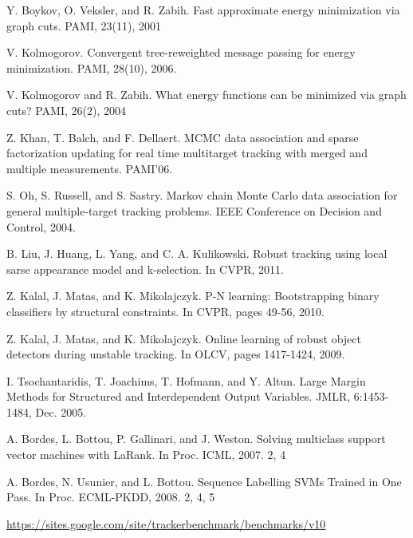 \documentclass{acm_proc_article-sp}
\begin{document}
\begin{thebibliography}{99}
Y. Boykov, O. Veksler, and R. Zabih. Fast approximate energy minimization via graph cuts. PAMI, 23(11), 2001

V. Kolmogorov. Convergent tree-reweighted message passing for energy minimization. PAMI, 28(10), 2006.

V. Kolmogorov and R. Zabih. What energy functions can be minimized via graph cuts? PAMI, 26(2), 2004

Z. Khan, T. Balch, and F. Dellaert. MCMC data association and sparse factorization updating for real time multitarget tracking with merged and multiple measurements. PAMI'06.

S. Oh, S. Russell, and S. Sastry. Markov chain Monte Carlo data association for general multiple-target tracking problems. IEEE Conference on Decision and Control, 2004.

B. Liu, J. Huang, L. Yang, and C. A. Kulikowski. Robust tracking using local sarse appearance model and k-selection. In CVPR, 2011.

Z. Kalal, J. Matas, and K. Mikolajczyk. P-N learning: Bootstrapping binary classifiers by structural constraints. In CVPR, pages 49-56, 2010.

Z. Kalal, J. Matas, and K. Mikolajczyk. Online learning of robust object detectors during unstable tracking. In OLCV, pages 1417-1424, 2009.

I. Tsochantaridis, T. Joachims, T. Hofmann, and Y. Altun. Large Margin Methods for Structured and Interdependent Output Variables. JMLR, 6:1453-1484, Dec. 2005.

A. Bordes, L. Bottou, P. Gallinari, and J. Weston. Solving multiclass support vector machines with LaRank. In Proc. ICML, 2007. 2, 4

A. Bordes, N. Usunier, and L. Bottou. Sequence Labelling SVMs Trained in One Pass. In Proc. ECML-PKDD, 2008. 2, 4, 5

\url{https://sites.google.com/site/trackerbenchmark/benchmarks/v10}

\end{thebibliography}
\end{document}
